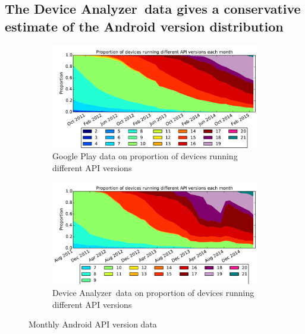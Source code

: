 \documentclass{llncs}
\newcommand{\da}{Device Analyzer}
\begin{document}
\subsection{The \da\ data gives a conservative estimate of the Android version distribution}
\label{sec:representative}
\begin{figure}[!h]
 \centering
 \begin{subfigure}[b]{\columnwidth}
 \includegraphics[width=\columnwidth]{figures/googleplayapi}
 \caption{Google Play data on proportion of devices running different API versions}
 \label{fig:play_api}
\end{subfigure}
\begin{subfigure}[b]{\columnwidth}
 \includegraphics[width=\columnwidth]{figures/norm_api_gpcomp}
 \caption{\da\ data on proportion of devices running different API versions}
 \label{fig:da_api}
\end{subfigure}
\caption{Monthly Android API version data}
\end{figure}
\end{document}
